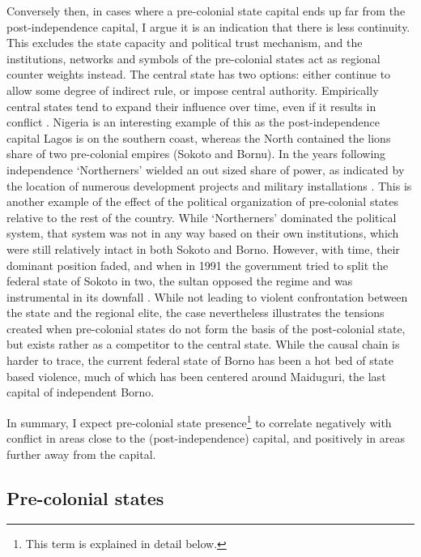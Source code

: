 \documentclass[12pt]{article}
\begin{document}
Conversely then, in cases where a pre-colonial state capital ends up far from
the post-independence capital, I argue it is an indication that there is less
continuity. This excludes the state capacity and political trust mechanism, and
the institutions, networks and symbols of the pre-colonial states act as
regional counter weights instead. The central state has two options: either
continue to allow some degree of indirect rule, or impose central authority.
Empirically central states tend to expand their influence over time, even if it
results in conflict \citep{Ying_2020}. Nigeria is an interesting example of this
as the post-independence capital Lagos is on the southern coast, whereas the
North contained the lions share of two pre-colonial empires (Sokoto and Bornu).
In the years following independence `Northerners' wielded an out sized share of
power, as indicated by the location of numerous development projects and
military installations \citep{Bates2008a}. This is another example of the effect
of the political organization of pre-colonial states relative to the rest of the
country. While `Northerners' dominated the political system, that system was not
in any way based on their own institutions, which were still relatively intact
in both Sokoto and Borno. However, with time, their dominant position faded, and
when in 1991 the government tried to split the federal state of Sokoto in two,
the sultan opposed the regime and was instrumental in its downfall
\citep{HiribarrenVincent2017AHoB}. While not leading to violent confrontation
between the state and the regional elite, the case nevertheless illustrates the
tensions created when pre-colonial states do not form the basis of the
post-colonial state, but exists rather as a competitor to the central state.
While the causal chain is harder to trace, the current federal state of Borno
has been a hot bed of state based violence, much of which has been centered
around Maiduguri, the last capital of independent Borno.

In summary, I expect pre-colonial state presence\footnote{This term is explained
in detail below.} to correlate negatively with conflict in areas close to the
(post-independence) capital, and positively in areas further away from the
capital.

\subsection{Pre-colonial states}
\end{document}

